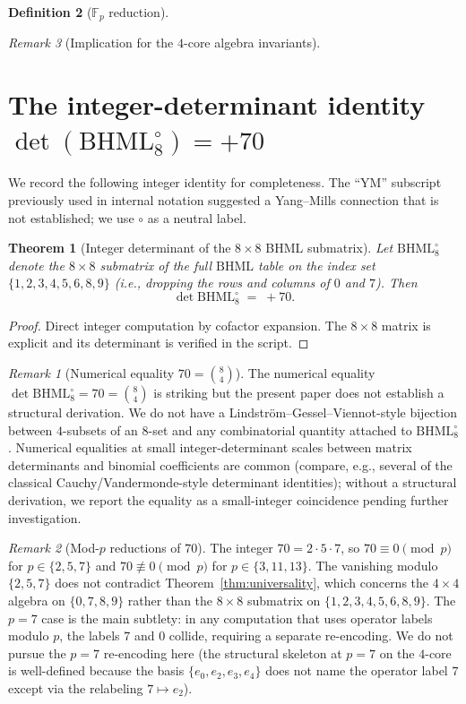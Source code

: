 \documentclass[11pt,reqno]{amsart}
\theoremstyle{plain}
\newtheorem{theorem}{Theorem}[section]
\theoremstyle{definition}
\newtheorem{definition}[theorem]{Definition}
\theoremstyle{remark}
\newtheorem*{remark}{Remark}
\newcommand{\F}{\mathbb{F}}
\newcommand{\BHML}{\mathrm{BHML}}
\begin{document}
\begin{definition}[$\F_{p}$ reduction]
\begin{remark}[Implication for the $4$-core algebra invariants]
\section{The integer-determinant identity
$\det(\BHML_{8}^{\circ}) = +70$}
\label{sec:bhml8}

We record the following integer identity for completeness. The
``YM'' subscript previously used in internal notation suggested a
Yang--Mills connection that is not established; we use $\circ$ as a
neutral label.

\begin{theorem}[Integer determinant of the $8 \times 8$ BHML
submatrix]
\label{thm:bhml8ym}
Let $\BHML_{8}^{\circ}$ denote the $8 \times 8$ submatrix of the
full $\BHML$ table on the index set
$\{1, 2, 3, 4, 5, 6, 8, 9\}$ (i.e., dropping the rows and columns
of $0$ and $7$). Then
\[
\det \BHML_{8}^{\circ} \;=\; +70.
\]
\end{theorem}

\begin{proof}
Direct integer computation by cofactor expansion. The $8 \times 8$
matrix is explicit and its determinant is verified in the script.
\end{proof}

\begin{remark}[Numerical equality $70 = \binom{8}{4}$]
The numerical equality $\det \BHML_{8}^{\circ} = 70 = \binom{8}{4}$
is striking but the present paper does not establish a structural
derivation. We do not have a Lindström--Gessel--Viennot-style
bijection between $4$-subsets of an $8$-set and any combinatorial
quantity attached to $\BHML_{8}^{\circ}$. Numerical equalities at
small integer-determinant scales between matrix determinants and
binomial coefficients are common (compare, e.g., several of the
classical Cauchy/Vandermonde-style determinant identities); without
a structural derivation, we report the equality as a small-integer
coincidence pending further investigation.
\end{remark}

\begin{remark}[Mod-$p$ reductions of $70$]
The integer $70 = 2 \cdot 5 \cdot 7$, so $70 \equiv 0 \pmod{p}$ for
$p \in \{2, 5, 7\}$ and $70 \not\equiv 0 \pmod{p}$ for $p \in
\{3, 11, 13\}$. The vanishing modulo $\{2, 5, 7\}$ does not
contradict Theorem~\ref{thm:universality}, which concerns the
$4 \times 4$ algebra on $\{0, 7, 8, 9\}$ rather than the
$8 \times 8$ submatrix on $\{1, 2, 3, 4, 5, 6, 8, 9\}$. The $p = 7$
case is the main subtlety: in any computation that uses operator
labels modulo $p$, the labels $7$ and $0$ collide, requiring a
separate re-encoding. We do not pursue the $p = 7$ re-encoding here
(the structural skeleton at $p = 7$ on the $4$-core is well-defined
because the basis $\{e_{0}, e_{2}, e_{3}, e_{4}\}$ does not name
the operator label $7$ except via the relabeling
$7 \mapsto e_{2}$).
\end{remark}


\end{remark}
\end{definition}
\end{document}

